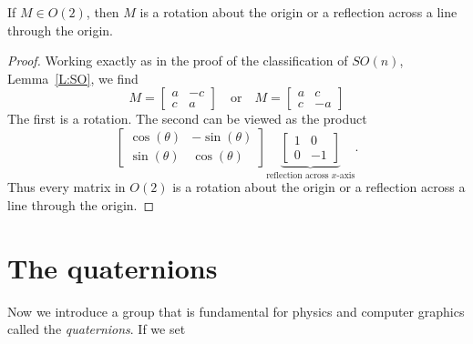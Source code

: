 \documentclass{ximera}
\begin{document}
\begin{theorem}
  If $M\in O(2)$, then $M$ is a rotation about the origin or a
  reflection across a line through the origin.
  \begin{proof}
    Working exactly as in the proof of the classification of $SO(n)$,
    Lemma~\ref{L:SO}, we find
    \[
    M = \begin{bmatrix}
      a & -c \\
      c & a
    \end{bmatrix} \quad\text{or}\quad
    M = \begin{bmatrix}
      a & c \\
      c & -a
    \end{bmatrix}
    \]
    The first is a rotation. The second can be viewed as the product
    \[
    \begin{bmatrix}
      \cos(\theta) & -\sin(\theta) \\
      \sin(\theta) & \cos(\theta)
    \end{bmatrix}
    \underbrace{\begin{bmatrix}
      1 & 0 \\
      0 & -1
    \end{bmatrix}}_{\text{reflection across $x$-axis}}.
    \]
    Thus every matrix in $O(2)$ is a rotation about the origin or a
    reflection across a line through the origin.
  \end{proof}
\end{theorem}


\section{The quaternions}

Now we introduce a group that is fundamental for physics and computer
graphics called the \textit{quaternions}. If we set
\end{document}

